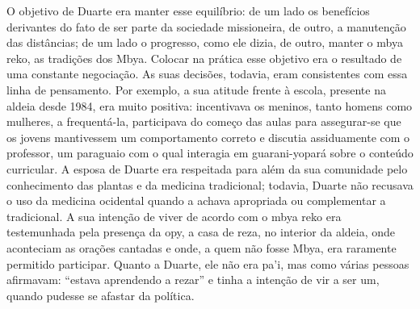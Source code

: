 O objetivo de Duarte era manter esse equilíbrio: de um lado os
benefícios derivantes do fato de ser parte da sociedade missioneira, de
outro, a manutenção das distâncias; de um lado o progresso, como ele
dizia, de outro, manter o mbya reko, as tradições dos Mbya. Colocar na
prática esse objetivo era o resultado de uma constante negociação. As
suas decisões, todavia, eram consistentes com essa linha de pensamento.
Por exemplo, a sua atitude frente à escola, presente na aldeia desde
1984, era muito positiva: incentivava os meninos, tanto homens como
mulheres, a frequentá-la, participava do começo das aulas para
assegurar-se que os jovens mantivessem um comportamento correto e
discutia assiduamente com o professor, um paraguaio com o qual
interagia em guarani-yopará sobre o conteúdo curricular. A esposa de
Duarte era respeitada para além da sua comunidade pelo conhecimento das
plantas e da medicina tradicional; todavia, Duarte não recusava o uso da
medicina ocidental quando a achava apropriada ou complementar a
tradicional. A sua intenção de viver de acordo com o mbya reko era
testemunhada pela presença da opy, a casa de reza, no interior da
aldeia, onde aconteciam as orações cantadas e onde, a quem não fosse
Mbya, era raramente permitido participar. Quanto a Duarte, ele não era
pa’i, mas como várias pessoas afirmavam: ``estava aprendendo a rezar'' e
tinha a intenção de vir a ser um, quando pudesse se afastar da
política.

